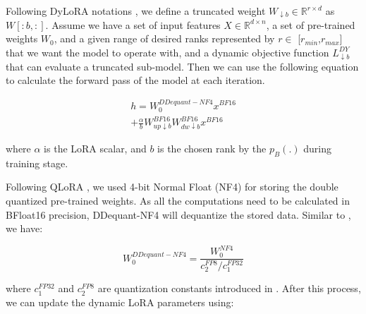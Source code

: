 \documentclass[11pt]{article}
\begin{document}
Following DyLoRA notations \cite{valipour2022DyLoRA}, we define a truncated weight $W_{\downarrow b} \in \mathbb{R}^{r \times d}$ as $W[:b,:]$. Assume we have a set of input features $X \in \mathbb{R}^{d\times n}$, a set of pre-trained weights $W_0$, and a given range of desired ranks represented by $r \in$ [$r_{min}$,$r_{max}$] that we want the model to operate with, and a dynamic objective function $L_{\downarrow b}^{DY}$ that 
can evaluate a truncated sub-model. Then we can use the following equation to calculate the forward pass of the model at each iteration.




\begin{multline}
h = W_0^{DDequant-NF4}x^{BF16} \\
+ \frac{\alpha}{b} W_{up \downarrow b}^{BF16} W_{dw \downarrow b}^{BF16} x^{BF16} 
\label{eq: LoRA}
\end{multline}


\noindent where $\alpha$ is the LoRA scalar, and $b$ is the chosen rank by the $p_B(.)$ during training stage.

Following QLoRA \cite{dettmers2023qlora}, we used 4-bit Normal Float (NF4) for storing the double quantized pre-trained weights. As all the computations need to be calculated in BFloat16 precision, DDequant-NF4 will dequantize the stored data. Similar to \cite{dettmers2023qlora}, we have:

\begin{equation}
    W_0^{DDequant-NF4}=\frac{W_0^{NF4}}{c_2^{FP8}/c_1^{FP32}}
\end{equation}

\noindent where $c_1^{FP32}$ and $c_2^{FP8}$ are quantization constants introduced in \cite{dettmers2023qlora}. %
After this process, we can update the dynamic LoRA parameters using:
\end{document}
